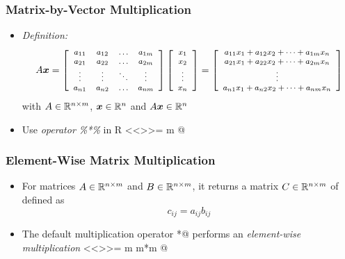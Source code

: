 \documentclass[%
  final,
  11pt, 
  show notes, %
  t, %
  fleqn, %
]{beamer}
\begin{document}
\begin{frame}[fragile]
  \frametitle{Matrix-by-Vector Multiplication}
\begin{itemize}
\item \emph{Definition:}
\begin{equation*}
\footnotesize
  A \bm{x} =
  \left[
    \begin{array}{cccc}
      a_{11} & a_{12} & \ldots & a_{1m}\\
      a_{21} & a_{22} & \ldots & a_{2m}\\
      \vdots & \vdots & \ddots & \vdots\\
      a_{n1} & a_{n2} & \ldots & a_{nm}
    \end{array}
  \right]
  \left[
    \begin{array}{c}
      x_1\\
      x_2\\
      \vdots\\
      x_n
    \end{array}
  \right]
  =
  \left[
    \begin{array}{c}
      a_{11}x_1+a_{12}x_2 + \cdots + a_{1m} x_n\\
      a_{21}x_1+a_{22}x_2 + \cdots + a_{2m} x_n\\
      \vdots\\
      a_{n1}x_1+a_{n2}x_2 + \cdots + a_{nm} x_n\\
    \end{array}
  \right] 
\end{equation*}
with $A \in\mathbb{R}^{n \times m}$, $\bm{x} \in\mathbb{R}^{n}$ and $A\bm{x} \in\mathbb{R}^n$
\item Use \emph{operator \%*\%} in R
<<>>=
m %
@
\end{itemize}
\end{frame}

\begin{frame}[fragile]
  \frametitle{Element-Wise Matrix Multiplication}
\begin{itemize}
\item For matrices $A \in\mathbb{R}^{n \times m}$ and $B \in\mathbb{R}^{n \times m}$, it returns a matrix $C \in\mathbb{R}^{n \times m}$ of defined as 
\begin{equation*}
c_{ij} = a_{ij} b_{ij}
\end{equation*}
\item The default multiplication operator \verb@*@ performs an \emph{element-wise multiplication}
<<>>=
m
m*m
@
\end{itemize}
\end{frame}
\end{document}
